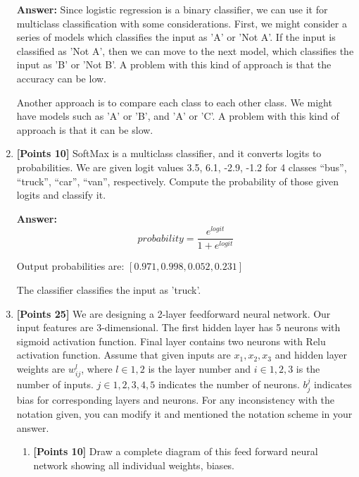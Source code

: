 \documentclass[12pt]{article}
\begin{document}
\begin{enumerate}
            \textbf{Answer:}
            Since logistic regression is a binary classifier, we can use it for
            multiclass classification with some considerations. First, we might
            consider a series of models which classifies the input as 'A' or 'Not
            A'. If the input is classified as 'Not A', then we can move to the
            next model, which classifies the input as 'B' or 'Not B'. A problem
            with this kind of approach is that the accuracy can be low.

            Another approach is to compare each class to each other class. We
            might have models such as 'A' or 'B', and 'A' or 'C'. A problem with
            this kind of approach is that it can be slow.

      \item \textbf{[Points 10]} SoftMax is a multiclass classifier, and it
            converts logits to probabilities. We are given logit values 3.5, 6.1,
            -2.9, -1.2 for 4 classes “bus”, “truck”, “car”, “van”, respectively.
            Compute the probability of those given logits and classify it.

            \textbf{Answer:}
            \begin{equation}
                  probability = \frac{e^{logit}}{1+e^{logit}}
            \end{equation}

            Output probabilities are: $[0.971, 0.998, 0.052, 0.231]$

            The classifier classifies the input as 'truck'.

      \item \textbf{[Points 25]} We are designing a 2-layer feedforward neural
            network. Our input features are 3-dimensional. The first hidden layer
            has 5 neurons with sigmoid activation function. Final layer contains
            two neurons with Relu activation function. Assume that given inputs
            are $x_1, x_2, x_3$ and hidden layer weights are $w_{ij}^{l}$, where
            $l \in {1, 2}$ is the layer number and $i \in {1,2,3}$ is the number
            of inputs. $j \in {1,2,3,4,5}$ indicates the number of neurons.
            $b_{j}^{j}$ indicates bias for corresponding layers and neurons. For
            any inconsistency with the notation given, you can modify it and
            mentioned the notation scheme in your answer.

            \begin{enumerate}
                  \item \textbf{[Points 10]} Draw a complete diagram of this feed
                        forward neural network showing all individual weights,
                        biases.


\end{enumerate}
\end{enumerate}
\end{document}
